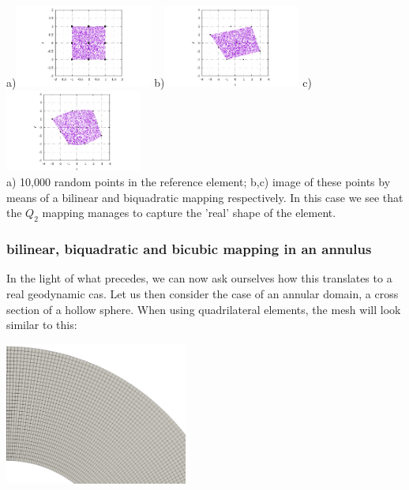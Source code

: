 \begin{center}
a)\includegraphics[width=4.5cm]{images/mappings/biquadratic2/rs.pdf}
b)\includegraphics[width=4.5cm]{images/mappings/biquadratic2/xyQ1.pdf}
c)\includegraphics[width=4.5cm]{images/mappings/biquadratic2/xyQ2.pdf}\\
{\small a) 10,000 random points in the reference element; b,c) image of these points
by means of a bilinear and biquadratic mapping respectively. In this case we see that 
the $Q_2$ mapping manages to capture the 'real' shape of the element.}
\end{center}

\subsubsection{bilinear, biquadratic and bicubic mapping in an annulus }

In the light of what precedes, we can now ask ourselves how this translates to 
a real geodynamic cas. Let us then consider the case of an annular domain, 
a cross section of a hollow sphere. 
When using quadrilateral elements, the mesh will look similar to this:

\begin{center}
\includegraphics[width=6cm]{images/mappings/curved/annulus_mesh}
\end{center}

